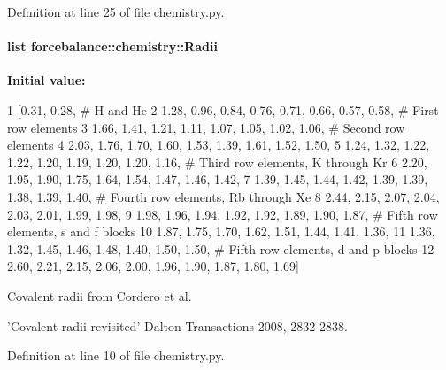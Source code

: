 \-Definition at line 25 of file chemistry.\-py.

\hypertarget{namespaceforcebalance_1_1chemistry_a5db7a023d3980e17137379852d5c8551}{
\paragraph[{\-Radii}]{\setlength{\rightskip}{0pt plus 5cm}list {\bf forcebalance\-::chemistry\-::\-Radii}}}\label{namespaceforcebalance_1_1chemistry_a5db7a023d3980e17137379852d5c8551}
{\bfseries \-Initial value\-:}
\begin{DoxyCode}
1 [0.31, 0.28, # H and He
2          1.28, 0.96, 0.84, 0.76, 0.71, 0.66, 0.57, 0.58, # First row elements
3          1.66, 1.41, 1.21, 1.11, 1.07, 1.05, 1.02, 1.06, # Second row elements
4          2.03, 1.76, 1.70, 1.60, 1.53, 1.39, 1.61, 1.52, 1.50, 
5          1.24, 1.32, 1.22, 1.22, 1.20, 1.19, 1.20, 1.20, 1.16, # Third row
       elements, K through Kr
6          2.20, 1.95, 1.90, 1.75, 1.64, 1.54, 1.47, 1.46, 1.42, 
7          1.39, 1.45, 1.44, 1.42, 1.39, 1.39, 1.38, 1.39, 1.40, # Fourth row
       elements, Rb through Xe
8          2.44, 2.15, 2.07, 2.04, 2.03, 2.01, 1.99, 1.98, 
9          1.98, 1.96, 1.94, 1.92, 1.92, 1.89, 1.90, 1.87, # Fifth row elements,
       s and f blocks
10          1.87, 1.75, 1.70, 1.62, 1.51, 1.44, 1.41, 1.36, 
11          1.36, 1.32, 1.45, 1.46, 1.48, 1.40, 1.50, 1.50, # Fifth row elements,
       d and p blocks
12          2.60, 2.21, 2.15, 2.06, 2.00, 1.96, 1.90, 1.87, 1.80, 1.69]
\end{DoxyCode}


\-Covalent radii from \-Cordero et al. 

'\-Covalent radii revisited' \-Dalton \-Transactions 2008, 2832-\/2838. 

\-Definition at line 10 of file chemistry.\-py.

